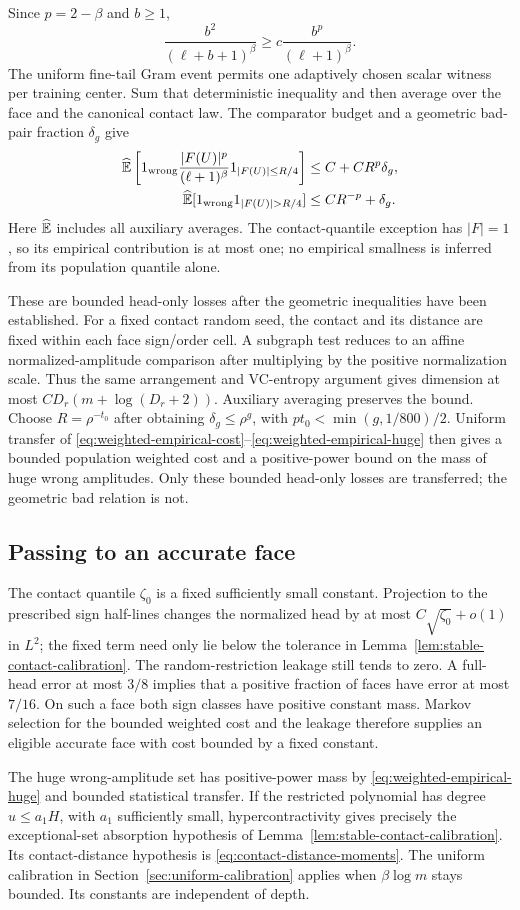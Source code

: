 Since $p=2-\beta$ and $b\ge1$,
\[
 \frac{b^2}{(\ell+b+1)^\beta}
 \ge c\frac{b^p}{(\ell+1)^\beta}.
\]
The uniform fine-tail Gram event permits one adaptively chosen scalar
witness per training center. Sum that deterministic inequality and
then average over the face and the canonical contact law. The
comparator budget and a geometric bad-pair fraction $\delta_g$ give
\begin{align}
 \widehat\E\left[
   1_{\rm wrong}\frac{|F(U)|^p}{(\ell+1)^\beta}
                      1_{|F(U)|\le R/4}\right]
    &\le C+CR^p\delta_g,\label{eq:weighted-empirical-cost}\\
 \widehat\E[1_{\rm wrong}1_{|F(U)|>R/4}]
    &\le CR^{-p}+\delta_g.\label{eq:weighted-empirical-huge}
\end{align}
Here $\widehat{\mathbb E}$ includes all auxiliary averages. The contact-quantile
exception has $|F|=1$, so its empirical contribution is at most one;
no empirical smallness is inferred from its population quantile alone.

These are bounded head-only losses after the geometric inequalities
have been established. For a fixed contact random seed, the contact
and its distance are fixed within each face sign/order cell.
A subgraph test reduces to an affine normalized-amplitude comparison
after multiplying by the positive normalization scale. Thus the same
arrangement and VC-entropy argument gives dimension at most
$CD_r(m+\log(D_r+2))$. Auxiliary averaging preserves the bound.
Choose $R=\rho^{-t_0}$ after obtaining $\delta_g\le\rho^g$, with
$pt_0<\min(g,1/800)/2$. Uniform transfer of
\eqref{eq:weighted-empirical-cost}--\eqref{eq:weighted-empirical-huge}
then gives a bounded population weighted cost and a positive-power
bound on the mass of huge wrong amplitudes. Only these bounded
head-only losses are transferred; the geometric bad relation is not.

\subsection{Passing to an accurate face}
The contact quantile $\zeta_0$ is a fixed sufficiently small constant.
Projection to the prescribed sign half-lines changes the normalized
head by at most $C\sqrt{\zeta_0}+o(1)$ in $L^2$; the fixed term need
only lie below the tolerance in
Lemma~\ref{lem:stable-contact-calibration}. The random-restriction
leakage still tends to zero. A full-head error at most $3/8$ implies
that a positive fraction of faces have error at most $7/16$. On such
a face both sign classes have positive constant mass. Markov selection
for the bounded weighted cost and the leakage therefore supplies an
eligible accurate face with cost bounded by a fixed constant.

The huge wrong-amplitude set has positive-power mass by
\eqref{eq:weighted-empirical-huge} and bounded statistical transfer.
If the restricted polynomial has degree $u\le a_1H$, with $a_1$
sufficiently small, hypercontractivity gives precisely the exceptional-set
absorption hypothesis of Lemma~\ref{lem:stable-contact-calibration}.
Its contact-distance hypothesis is
\eqref{eq:contact-distance-moments}. The uniform calibration in
Section~\ref{sec:uniform-calibration} applies when $\beta\log m$ stays
bounded. Its constants are independent of depth.

